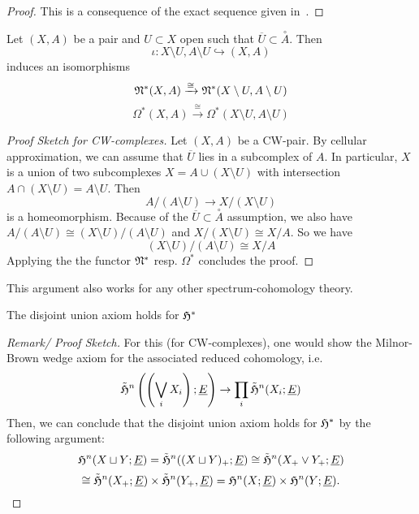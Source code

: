 \documentclass[a4paper,11pt]{article}
\begin{document}
\begin{proof}
    This is a consequence of the exact sequence given in\ \cite[p.261]{spanier}.
\end{proof}

\begin{lemma}[Excision]\label{coexcision}
    Let \((X,A)\) be a pair and \(U\subset X\) open such that \(\overline{U}\subset\overset{\circ}A\). Then \[\iota:X\setminus U,A\setminus U\hookrightarrow(X,A)\]
    induces an isomorphisms
    \[\mathfrak{N}^\ast(X,A)\xrightarrow{\cong}\mathfrak{N}^\ast(X\setminus U,A\setminus U)\]
    \[\Omega^\ast(X,A)\xrightarrow{\cong}\Omega^\ast(X\setminus U,A\setminus U)\]
\end{lemma}

\begin{proof}[Proof Sketch for CW-complexes]\cite[Chapter 6, p.250]{adams}
    Let \((X,A)\) be a CW-pair. By cellular approximation, we can assume that \(\overline{U}\) lies in a subcomplex of \(A\). In particular, \(X\) is a union of two subcomplexes \(X=A\cup(X\setminus U)\) with intersection \(A\cap(X\setminus U)=A\setminus U\). Then
    \[A\big/(A\setminus U)\to X\big/(X\setminus U)\]
    is a homeomorphism. Because of the \(\overline U\subset \overset{\circ}A\) assumption, we also have \(A\big/(A\setminus U)\cong (X\setminus U)\big/(A\setminus U)\) and \(X\big/(X\setminus U)\cong X\big/A\). So we have
    \[(X\setminus U)\big/(A\setminus U)\cong X\big/A\]
    Applying the the functor \(\mathfrak{N}^\ast\) resp. \(\Omega^\ast\) concludes the proof.
\end{proof}

\begin{remark}
    This argument also works for any other spectrum-cohomology theory.
\end{remark}

\begin{lemma}\label{codisjoint}
    The disjoint union axiom holds for \(\mathfrak{H}^\ast\)
\end{lemma}

\begin{proof}[Remark/ Proof Sketch]\cite[Chapter 6]{adams}
    For this (for CW-complexes), one would show the Milnor-Brown wedge axiom for the associated reduced cohomology, i.e.
    \[\tilde{\mathfrak{H}}^n\left(\left(\bigvee_i X_i\right);\underline{E}\right)\to\prod_i\tilde{\mathfrak{H}}^n(X_i;\underline{E})\]
    Then, we can conclude that the disjoint union axiom holds for \(\mathfrak{H}^\ast\) by the following argument:
    \[\mathfrak{H}^n(X\sqcup Y;\underline{E})=\tilde{\mathfrak{H}}^n((X\sqcup Y)_+;\underline{E})\cong\tilde{\mathfrak{H}}^n(X_+\vee Y_+;\underline{E})\]\[\cong\tilde{\mathfrak{H}}^n(X_+;\underline{E})\times\tilde{\mathfrak{H}}^n(Y_+,\underline{E})=\mathfrak{H}^n(X;\underline{E})\times\mathfrak{H}^n(Y;\underline{E}).\]
\end{proof}
\end{document}
